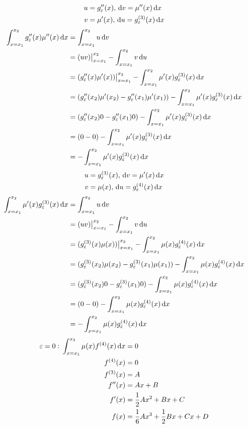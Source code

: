 \documentclass{article}
\begin{document}
\begin{align*}
  u &= g_\varepsilon''(x), \, \mathrm{d}v = \mu''(x) \, \mathrm{d}x \\
  v &= \mu'(x), \, \mathrm{d}u = g_\varepsilon^{(3)}(x) \, \mathrm{d}x
\end{align*}
\begin{align*}
  \int_{x=x_1}^{x_2} g_\varepsilon''(x)\mu''(x) \, \mathrm{d}x
  &= \int_{x=x_1}^{x_2}u\, \mathrm{d}v \\
  &= (uv)\big|_{x=x_1}^{x_2} - \int_{x=x_1}^{x_2} v \, \mathrm{d}u \\
  &= (g_\varepsilon''(x)\mu'(x))\big|_{x=x_1}^{x_2} - \int_{x=x_1}^{x_2} \mu'(x)g_\varepsilon^{(3)}(x) \, \mathrm{d}x \\
  &= (g_\varepsilon''(x_2)\mu'(x_2)-g_\varepsilon''(x_1)\mu'(x_1)) - \int_{x=x_1}^{x_2} \mu'(x)g_\varepsilon^{(3)}(x) \, \mathrm{d}x \\
  &= (g_\varepsilon''(x_2)0-g_\varepsilon''(x_1)0) - \int_{x=x_1}^{x_2} \mu'(x)g_\varepsilon^{(3)}(x) \, \mathrm{d}x \\
  &= (0-0) - \int_{x=x_1}^{x_2} \mu'(x)g_\varepsilon^{(3)}(x) \, \mathrm{d}x \\
  &= -\int_{x=x_1}^{x_2} \mu'(x)g_\varepsilon^{(3)}(x) \, \mathrm{d}x
\end{align*}
\begin{align*}
  u &= g_\varepsilon^{(3)}(x), \, \mathrm{d}v = \mu'(x) \, \mathrm{d}x \\
  v &= \mu(x), \, \mathrm{d}u = g_\varepsilon^{(4)}(x) \, \mathrm{d}x
\end{align*}
\begin{align*}
  \int_{x=x_1}^{x_2} \mu'(x)g_\varepsilon^{(3)}(x) \, \mathrm{d}x
  &= \int_{x=x_1}^{x_2}u\, \mathrm{d}v \\
  &= (uv)\big|_{x=x_1}^{x_2} - \int_{x=x_1}^{x_2} v \, \mathrm{d}u \\
  &= (g_\varepsilon^{(3)}(x)\mu(x))\big|_{x=x_1}^{x_2} - \int_{x=x_1}^{x_2} \mu(x) g_\varepsilon^{(4)}(x) \, \mathrm{d}x \\
  &= (g_\varepsilon^{(3)}(x_2)\mu(x_2)-g_\varepsilon^{(3)}(x_1)\mu(x_1)) - \int_{x=x_1}^{x_2} \mu(x) g_\varepsilon^{(4)}(x) \, \mathrm{d}x \\
  &= (g_\varepsilon^{(3)}(x_2)0-g_\varepsilon^{(3)}(x_1)0) - \int_{x=x_1}^{x_2} \mu(x) g_\varepsilon^{(4)}(x) \, \mathrm{d}x \\
  &= (0-0) - \int_{x=x_1}^{x_2} \mu(x) g_\varepsilon^{(4)}(x) \, \mathrm{d}x \\
  &= -\int_{x=x_1}^{x_2} \mu(x) g_\varepsilon^{(4)}(x) \, \mathrm{d}x
\end{align*}
\begin{align*}
  \varepsilon = 0:\, \int_{x=x_1}^{x_2} \mu(x) f^{(4)}(x) \, \mathrm{d}x &= 0 \\
  f^{(4)}(x) &= 0 \\
  f^{(3)}(x) &= A \\
  f''(x) &= Ax+B \\
  f'(x) &= \frac{1}{2}Ax^2+Bx+C \\
  f(x) &= \frac{1}{6}Ax^3+\frac{1}{2}Bx+Cx+D \\
\end{align*}
\begin{align*}
  \end{align*}
\end{document}
